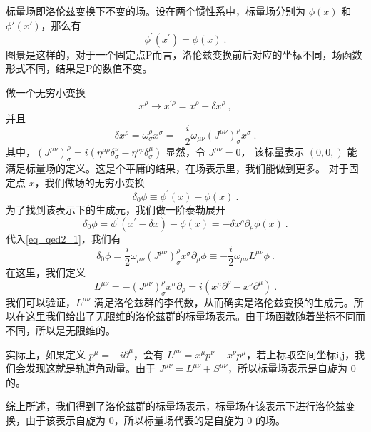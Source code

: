 \begin{definition}{}
标量场即洛伦兹变换下不变的场。设在两个惯性系中，标量场分别为 $\phi(x)$ 和 $\phi'(x')$，那么有
\begin{equation}
\phi^{\prime}\left(x^{\prime}\right)=\phi(x)~.
\end{equation}
图景是这样的，对于一个固定点P而言，洛伦兹变换前后对应的坐标不同，场函数形式不同，结果是P的数值不变。
\end{definition}
\begin{corollary}{}
做一个无穷小变换
\begin{equation}
x^{\rho} \rightarrow x^{\prime \rho}=x^{\rho}+\delta x^{\rho}~,
\end{equation}
并且
\begin{equation}\label{eq_qed2_1}
\delta x^{\rho}=\omega_{\sigma}^{\rho} x^{\sigma}=-\frac{i}{2} \omega_{\mu \nu}\left(J^{\mu \nu}\right)_{\sigma}^{\rho} x^{\sigma}~.
\end{equation}
其中，$\left(J^{\mu \nu}\right)_{\sigma}^{\rho}=i\left(\eta^{\mu \rho} \delta_{\sigma}^{\nu}-\eta^{\nu \rho} \delta_{\sigma}^{\mu}\right)$
显然，令 $J^{\mu \nu}=0$， 该标量表示 $(0,0,)$ 能满足标量场的定义。这是个平庸的结果，在场表示里，我们能做到更多。 对于固定点 $x$，我们做场的无穷小变换
\begin{equation}
\delta_{0} \phi \equiv \phi^{\prime}(x)-\phi(x)~.
\end{equation}
为了找到该表示下的生成元，我们做一阶泰勒展开
\begin{equation}
\delta_{0} \phi=\phi^{\prime}\left(x^{\prime}-\delta x\right)-\phi(x)=-\delta x^{\rho} \partial_{\rho} \phi(x)~.
\end{equation}
代入\autoref{eq_qed2_1}，我们有
\begin{equation}
\delta_{0} \phi=\frac{i}{2} \omega_{\mu \nu}\left(J^{\mu \nu}\right)_{\sigma}^{\rho} x^{\sigma} \partial_{\rho} \phi \equiv-\frac{i}{2} \omega_{\mu \nu} L^{\mu \nu} \phi~.
\end{equation}
在这里，我们定义
\begin{equation}
L^{\mu \nu}=-\left(J^{\mu \nu}\right)_{\sigma}^{\rho} x^{\sigma} \partial_{\rho}=i\left(x^{\mu} \partial^{\nu}-x^{\nu} \partial^{\mu}\right)~.
\end{equation}
我们可以验证，$L^{\mu \nu}$ 满足洛伦兹群的李代数，从而确实是洛伦兹变换的生成元。所以在这里我们给出了无限维的洛伦兹群的标量场表示。由于场函数随着坐标不同而不同，所以是无限维的。

实际上，如果定义 $p^{\mu}=+i \partial^{\mu}$，会有 $L^{\mu \nu}=x^{\mu} p^{\nu}-x^{\nu} p^{\mu}$，若上标取空间坐标i,j，我们会发现这就是轨道角动量。由于 $J^{\mu \nu}=L^{\mu \nu}+S^{\mu \nu}$，所以标量场表示是自旋为 0 的。

综上所述，我们得到了洛伦兹群的标量场表示，标量场在该表示下进行洛伦兹变换，由于该表示自旋为 0，所以标量场代表的是自旋为 0 的场。
\end{corollary}

